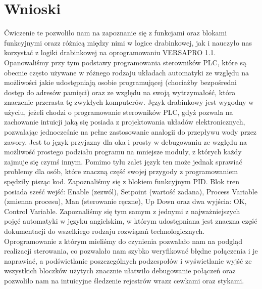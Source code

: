 \documentclass[a4paper, 12pt]{article}
\begin{document}
	\section{Wnioski}
		Ćwiczenie te pozwoliło nam na zapoznanie się z funkcjami oraz blokami funkcyjnymi oraz\linebreak z różnicą między nimi w logice drabinkowej, jak i nauczyło nas korzystać z logiki drabinkowej na oprogramowaniu VERSAPRO 1.1. Opanowaliśmy przy tym podstawy programowania sterowników PLC, które są obecnie często używane w różnego rodzaju układach automatyki ze względu na możliwości jakie udostępniają osobie programującej (chociażby bezpośredni dostęp do adresów pamięci) oraz ze względu na swoją wytrzymałość, która znaczenie przerasta tę zwykłych komputerów. 
		\newline
		\newline
		Język drabinkowy jest wygodny w użyciu, jeżeli chodzi o programowanie sterowników PLC, gdyż pozwala na zachowanie intuicji jaką się posiada z projektowania układów elektronicznych, pozwalając jednocześnie na pełne zastosowanie analogii do przepływu wody przez zawory. Jest to język przyjazny dla oka i prosty w debugowaniu ze względu na możliwość prostego podziału programu na mniejsze moduły, z których każdy zajmuje się czymś innym. Pomimo tylu zalet język ten może jednak sprawiać problemy dla osób, które znaczną część swojej przygody z programowaniem spędziły pisząc kod.
		\newline
		\newline
		Zapoznaliśmy się z blokiem funkcyjnym PID. Blok tren posiada sześć wejść: Enable (zezwól), Setpoint (wartość zadana), Process Variable (zmienna procesu), Man (sterowanie ręczne), Up Down oraz dwa wyjścia: OK, Control Variable. Zapoznaliśmy się tym samym z jednymi z najważniejszych pojęć automatyki w języku angielskim, w którym udostępniana jest znaczna część dokumentacji do wszelkiego rodzaju rozwiązań technologicznych.
		\newline
		\newline
		Oprogramowanie z którym mieliśmy do czynienia pozwalało nam na podgląd realizacji sterowania, co pozwalało nam szybko weryfikować błędne połączenia i je naprawiać, a podświetlanie poszczególnych podzespołów i wyświetlanie wyjść ze wszystkich bloczków użytych znacznie ułatwiło debugowanie połączeń oraz pozwoliło nam na intuicyjne śledzenie rejestrów wraz\linebreak z cewkami oraz stykami.
		\newline 
		\newline
\end{document}
